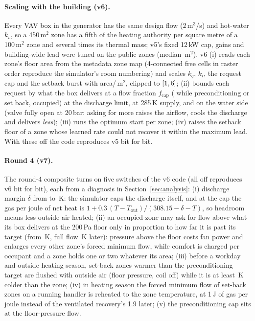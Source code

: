 \documentclass{article}
\begin{document}
\paragraph{Scaling with the building (v6).}
Every VAV box in the generator has the same design flow (2\,m$^3$/s) and hot-water $k_v$, so
a 450\,m$^2$ zone has a fifth of the heating authority per square metre of a 100\,m$^2$ zone
and several times its thermal mass; v5's fixed 12\,kW cap, gains and building-wide lead were
tuned on the public zones (median \PubZoneAreaMedian\,m$^2$). v6 (i) reads each zone's floor
area from the metadata zone map (4-connected free cells in raster order reproduce the
simulator's room numbering) and scales $k_q$, $k_i$, the request cap and the setback burst with
area/\ParAreaRef\,m$^2$, clipped to $[1, 6]$; (ii) bounds each
request by what the box delivers at a flow fraction $f_{\text{cap}}$ (\VSixFCapPre{} while
preconditioning or set back, \ParFCapOcc{} occupied) at the discharge limit, at 285\,K supply,
and on the water side (valve fully open at 20\,bar: asking for more raises the airflow, cools
the discharge and delivers \emph{less}); (iii) runs the optimum start per zone; (iv) raises the
setback floor of a zone whose learned rate could not recover it within the maximum lead. With
these off the code reproduces v5 bit for bit.

\paragraph{Round 4 (v7).}
\label{sec:v7}
The round-4 composite turns on five switches of the v6 code (all off reproduces v6 bit for bit),
each from a diagnosis in Section~\ref{sec:analysis}: (i) discharge margin $\delta$ from \VSixDischMargin{} to
\ParRFDischMargin\,K: the simulator caps the discharge itself, and at the cap the gas per joule of
net heat is $1 + 0.3\,(T - T_{\text{out}})/(308.15 - \delta - T)$, so headroom means less outside
air heated; (ii) an occupied zone may ask for flow above what its box delivers at the 200\,Pa
floor only in proportion to how far it is past its target (from \ParRFOccEzero\,K, full flow
\ParRFOccSpan\,K later): pressure above the floor costs fan power and enlarges every other zone's
forced minimum flow, while comfort is charged per occupant and a zone holds one or two whatever
its area; (iii) before a workday and outside heating season, set-back zones warmer than the
preconditioning target are flushed with outside air (floor pressure, coil off) while it is at
least \ParRFFlushDt\,K colder than the zone; (iv) in heating season the forced minimum flow of set-back
zones on a running handler is reheated to the zone temperature, at 1\,J of gas per joule instead of
the ventilated recovery's 1.9 later; (v) the preconditioning cap sits at the floor-pressure flow.
\end{document}
